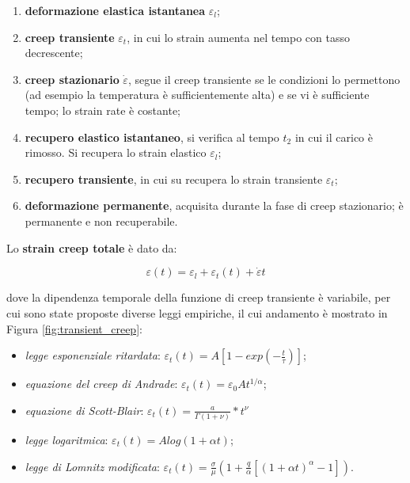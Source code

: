 \documentclass[a4paper,12pt]{book}
\begin{document}
\begin{enumerate}
    \item \textbf{deformazione elastica istantanea} $\varepsilon_l$;
    \item \textbf{creep transiente} $\varepsilon_t$, in cui lo strain aumenta nel tempo con tasso decrescente;
    \item \textbf{creep stazionario} $\dot{\varepsilon}$, segue il creep transiente se le condizioni lo permettono
    (ad esempio la temperatura è sufficientemente alta) e se vi è sufficiente tempo; lo strain rate è costante;
    \item \textbf{recupero elastico istantaneo}, si verifica al tempo $t_2$ in cui il carico è rimosso.
    Si recupera lo strain elastico $\varepsilon_l$;
    \item \textbf{recupero transiente}, in cui su recupera lo strain transiente $\varepsilon_t$;
    \item \textbf{deformazione permanente}, acquisita durante la fase di creep stazionario; è permanente e non recuperabile.
\end{enumerate}

\noindent
Lo \textbf{strain creep totale} è dato da:

\begin{equation}
    \varepsilon(t) = \varepsilon_l + \varepsilon_t(t) + \dot{\varepsilon} t
\end{equation}

\noindent
dove la dipendenza temporale della funzione di creep transiente è variabile, per cui sono state proposte diverse leggi empiriche, il cui andamento è mostrato in Figura \ref{fig:transient_creep}:

\begin{itemize}
    \item \textit{legge esponenziale ritardata}: $\varepsilon_t (t) = A [1-exp(- \frac{t}{\tau})]$;
    \item \textit{equazione del creep di Andrade}: $\varepsilon_t (t) = \varepsilon_0 At^{1/\alpha}$;
    \item \textit{equazione di Scott-Blair}: $\varepsilon_t (t) = \frac{a}{\Gamma(1 + \nu)} * t^{\nu}$
    \item \textit{legge logaritmica}: $\varepsilon_t (t) = A log(1 + \alpha t)$;
    \item \textit{legge di Lomnitz modificata}: $\varepsilon_t (t) = \frac{\sigma}{\mu} \left(1 + \frac{q}{\alpha} [(1 + \alpha t)^\alpha -1] \right)$.
\end{itemize}
\end{document}
